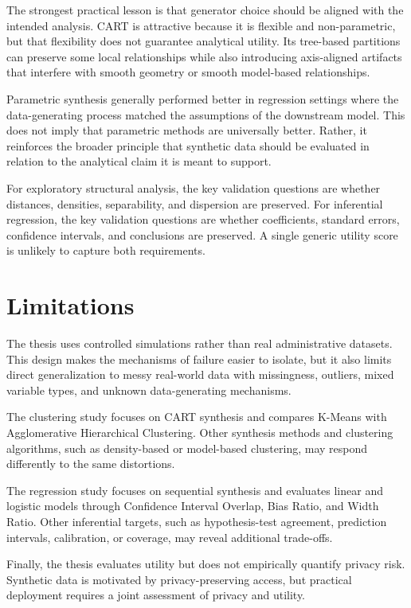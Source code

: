 The strongest practical lesson is that generator choice should be aligned with the intended analysis. CART is attractive because it is flexible and non-parametric, but that flexibility does not guarantee analytical utility. Its tree-based partitions can preserve some local relationships while also introducing axis-aligned artifacts that interfere with smooth geometry or smooth model-based relationships.

Parametric synthesis generally performed better in regression settings where the data-generating process matched the assumptions of the downstream model. This does not imply that parametric methods are universally better. Rather, it reinforces the broader principle that synthetic data should be evaluated in relation to the analytical claim it is meant to support.

For exploratory structural analysis, the key validation questions are whether distances, densities, separability, and dispersion are preserved. For inferential regression, the key validation questions are whether coefficients, standard errors, confidence intervals, and conclusions are preserved. A single generic utility score is unlikely to capture both requirements.

\section{Limitations}
\label{sec:general-limitations}

The thesis uses controlled simulations rather than real administrative datasets. This design makes the mechanisms of failure easier to isolate, but it also limits direct generalization to messy real-world data with missingness, outliers, mixed variable types, and unknown data-generating mechanisms.

The clustering study focuses on CART synthesis and compares K-Means with Agglomerative Hierarchical Clustering. Other synthesis methods and clustering algorithms, such as density-based or model-based clustering, may respond differently to the same distortions.

The regression study focuses on sequential synthesis and evaluates linear and logistic models through Confidence Interval Overlap, Bias Ratio, and Width Ratio. Other inferential targets, such as hypothesis-test agreement, prediction intervals, calibration, or coverage, may reveal additional trade-offs.

Finally, the thesis evaluates utility but does not empirically quantify privacy risk. Synthetic data is motivated by privacy-preserving access, but practical deployment requires a joint assessment of privacy and utility.

